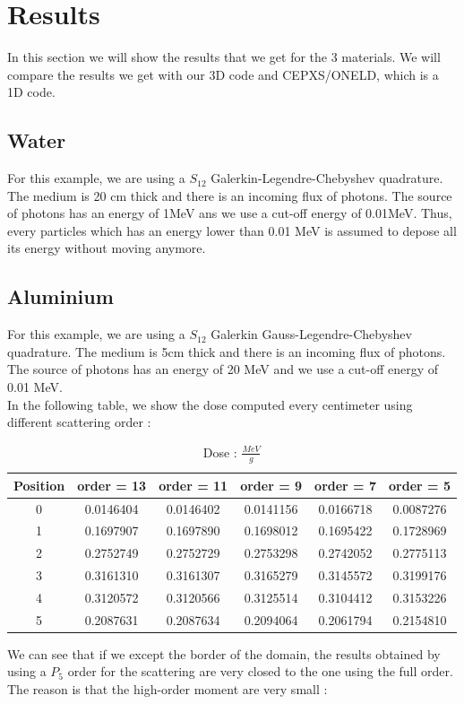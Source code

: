 \section{Results}
In this section we will show the results that we get for the 3 materials. We
will compare the results we get with our 3D code and CEPXS/ONELD, which is a
1D code. 
\subsection{Water}
For this example, we are using a $S_{12}$ Galerkin-Legendre-Chebyshev
quadrature. The medium is 20 cm thick and there is an incoming flux of
photons. The source of photons has an energy of 1MeV ans we use a cut-off
energy of 0.01MeV. Thus, every particles which has an energy lower than 
0.01 MeV is assumed to depose all its energy without moving anymore.
\subsection{Aluminium}
For this example, we are using a $S_{12}$ Galerkin Gauss-Legendre-Chebyshev 
quadrature. The medium is 5cm thick and there is an incoming flux of photons.
The source of photons has an energy of 20 MeV and we use a cut-off energy of
0.01 MeV.\\
In the following table, we show the dose computed every centimeter using
different scattering order :
\begin{table}[H]
\begin{center}
\begin{tabular}{|c|c|c|c|c|c|}
\hline
Position & order = 13 & order = 11 & order = 9 & order = 7 & order = 5 \\
\hline
0 & 0.0146404 & 0.0146402 & 0.0141156 & 0.0166718 & 0.0087276 \\
1 & 0.1697907 & 0.1697890 & 0.1698012 & 0.1695422 & 0.1728969 \\
2 & 0.2752749 & 0.2752729 & 0.2753298 & 0.2742052 & 0.2775113 \\
3 & 0.3161310 & 0.3161307 & 0.3165279 & 0.3145572 & 0.3199176 \\
4 & 0.3120572 & 0.3120566 & 0.3125514 & 0.3104412 & 0.3153226 \\
5 & 0.2087631 & 0.2087634 & 0.2094064 & 0.2061794 & 0.2154810 \\
\hline
\end{tabular}
\caption{Dose : $\frac{MeV}{g}$}
\end{center}
\end{table}     
We can see that if we except the border of the domain, the results obtained by
using a $P_5$ order for the scattering are very closed to the one using the
full order. The reason is that the high-order moment are very small :
               
